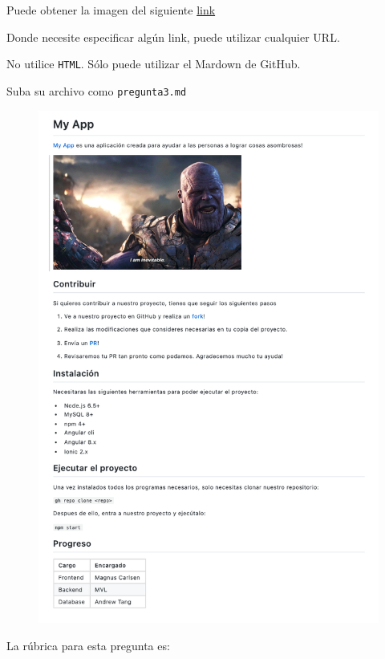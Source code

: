 \documentclass[12pt]{exam}
\begin{document}
\begin{questions}
Puede obtener la imagen del siguiente \href{https://preview.redd.it/sk9nb6lgccq31.gif?format=png8&s=4314adede1e763a54cb4b435e3d246da0460d3ae}{link}

Donde necesite especificar algún link, puede utilizar cualquier URL.

No utilice \lstinline{HTML}. Sólo puede utilizar el Mardown de GitHub.

Suba su archivo como \lstinline{pregunta3.md}

\newpage

\begin{figure}[ht!]
  \centering
  \includegraphics[width=0.9\linewidth]{../figures/pregunta3.png}
  \label{fig:p3}
\end{figure}

\newpage

La rúbrica para esta pregunta es:

\begin{table}[h]
\end{table}
\end{questions}
\end{document}
